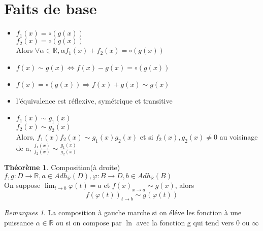 \documentclass[fleqn]{article}
\theoremstyle{definition} \newtheorem*{defi}{D\'efinition}
\theoremstyle{definition} \newtheorem*{theo}{Th\'eor\`eme}
\theoremstyle{remark} \newtheorem*{rqs}{Remarques}
\begin{document}
\section{Faits de base}
\begin{itemize}
	\item $f_1(x) = \circ (g(x))$ \\
		$f_2(x)	= \circ (g(x))$ \\
		Alors $\forall \alpha \in \mathbb{R}, \alpha f_1(x) + f_2(x) = \circ (g(x))$
	\item $f(x) \sim g(x) \Leftrightarrow f(x) - g(x) = \circ (g(x))$
	\item $f(x) = \circ(g(x)) \Rightarrow f(x) + g(x) \sim g(x)$
	\item l'\'equivalence est r\'eflexive, sym\'etrique et transitive
	\item $f_1(x) \sim g_1(x)$\\
		$f_2(x) \sim g_2(x)$\\
		Alors, $f_1(x)f_2(x) \sim g_1(x)g_2(x)$ et si $f_2(x), g_2(x) \neq 0$ au voisinage de a, $\frac{f_1(x)}{f_2(x)} \sim
		\frac{g_1(x)}{g_2(x)}$
\end{itemize}

\begin{theo} Composition(\`a droite)\\
	$f,g: D \rightarrow \mathbb{R}, a \in Adh_{\overline{\mathbb{R}}}(D), \varphi: B \rightarrow D, b \in Adh_{\overline{\mathbb{R}}}(B)$ \\
	On suppose $\lim_{t \to b}\varphi(t) = a$ et $f(x)_{x \to a} \sim g(x)$, alors 
	\[f(\varphi(t))_{t \to b} \sim g(\varphi(t))\]

\end{theo}

\begin{rqs}
	La composition \`a gauche marche si on \'el\'eve les fonction \`a une puissance $\alpha \in \mathbb{R}$ ou si on compose par $\ln$ avec la
	fonction g qui tend vers $0$ ou $\infty$
\end{rqs}
\end{document}
